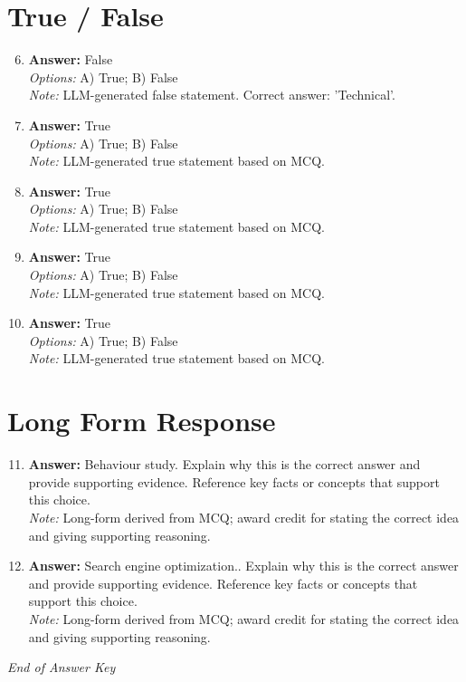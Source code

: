 \documentclass[12pt]{article}
\begin{document}
\section*{True / False}
\begin{enumerate}[label=\arabic*.]
\setcounter{enumi}{5}
\item \textbf{Answer:} False
\\ \textit{Options:} A) True; B) False
\\ \textit{Note:} LLM-generated false statement. Correct answer: 'Technical'.
\item \textbf{Answer:} True
\\ \textit{Options:} A) True; B) False
\\ \textit{Note:} LLM-generated true statement based on MCQ.
\item \textbf{Answer:} True
\\ \textit{Options:} A) True; B) False
\\ \textit{Note:} LLM-generated true statement based on MCQ.
\item \textbf{Answer:} True
\\ \textit{Options:} A) True; B) False
\\ \textit{Note:} LLM-generated true statement based on MCQ.
\item \textbf{Answer:} True
\\ \textit{Options:} A) True; B) False
\\ \textit{Note:} LLM-generated true statement based on MCQ.
\end{enumerate}

\section*{Long Form Response}
\begin{enumerate}[label=\arabic*.]
\setcounter{enumi}{10}
\item \textbf{Answer:} Behaviour study. Explain why this is the correct answer and provide supporting evidence. Reference key facts or concepts that support this choice.
\\ \textit{Note:} Long-form derived from MCQ; award credit for stating the correct idea and giving supporting reasoning.
\item \textbf{Answer:} Search engine optimization.. Explain why this is the correct answer and provide supporting evidence. Reference key facts or concepts that support this choice.
\\ \textit{Note:} Long-form derived from MCQ; award credit for stating the correct idea and giving supporting reasoning.
\end{enumerate}

\vfill
\noindent\textit{End of Answer Key}
\end{document}
